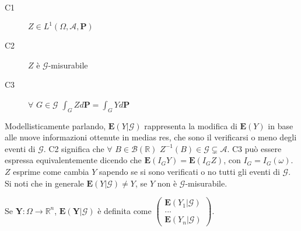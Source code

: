 \documentclass{article}
\begin{document}
\begin{description}
\item[C1] $Z\in L^{1}\left( \Omega ,\mathcal{A},\mathbf{P}\right) $

\item[C2] $Z$ \`{e} $\mathcal{G}$-misurabile

\item[C3] $\forall $ $G\in \mathcal{G}$ $\int_{G}Zd\mathbf{P=}\int_{G}Yd%
\mathbf{P}$
\end{description}

Modellisticamente parlando, $\mathbf{E}\left( Y|\mathcal{G}\right) $
rappresenta la modifica di $\mathbf{E}\left( Y\right) $ in base alle nuove
informazioni ottenute in medias res, che sono il verificarsi o meno degli
eventi di $\mathcal{G}$. C2 significa che $\forall $ $B\in \mathcal{B}\left( 
\mathbb{R}
\right) $ $Z^{-1}\left( B\right) \in \mathcal{G\varsubsetneq A}$. C3 pu\`{o}
essere espressa equivalentemente dicendo che $\mathbf{E}\left( I_{G}Y\right)
=\mathbf{E}\left( I_{G}Z\right) $, con $I_{G}=I_{G}\left( \omega \right) $. $%
Z$ esprime come cambia $Y$ sapendo se si sono verificati o no tutti gli
eventi di $\mathcal{G}$. Si noti che in generale $\mathbf{E}\left( Y|%
\mathcal{G}\right) \neq Y$, se $Y$ non \`{e} $\mathcal{G}$-misurabile.

Se $\mathbf{Y}:\Omega \rightarrow 
\mathbb{R}
^{n}$, $\mathbf{E}\left( \mathbf{Y}|\mathcal{G}\right) $ \`{e} definita come 
$\left( 
\begin{array}{c}
\mathbf{E}\left( Y_{1}|\mathcal{G}\right) \\ 
... \\ 
\mathbf{E}\left( Y_{n}|\mathcal{G}\right)%
\end{array}%
\right) $.
\end{document}
